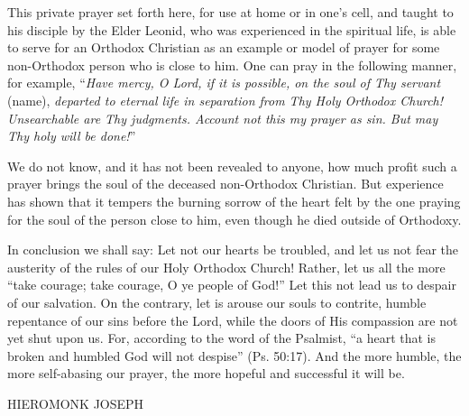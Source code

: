 This private prayer set forth here, for use at home or in one's cell, and taught to his disciple by the Elder Leonid, who was experienced in the spiritual life, is able to serve for an Orthodox Christian as an example or model of prayer for some non-Orthodox person who is close to him. One can pray in the following manner, for example, ``\textit{Have mercy, O Lord, if it is possible, on the soul of Thy servant} (name), \textit{departed to eternal life in separation from Thy Holy Orthodox Church! Unsearchable are Thy judgments. Account not this my prayer as sin. But may Thy holy will be done!}''

We do not know, and it has not been revealed to anyone, how much profit such a prayer brings the soul of the deceased non-Orthodox Christian. But experience has shown that it tempers the burning sorrow of the heart felt by the one praying for the soul of the person close to him, even though he died outside of Orthodoxy.

In conclusion we shall say: Let not our hearts be troubled, and let us not fear the austerity of the rules of our Holy Orthodox Church! Rather, let us all the more ``take courage; take courage, O ye people of God!'' Let this not lead us to despair of our salvation. On the contrary, let is arouse our souls to contrite, humble repentance of our sins before the Lord, while the doors of His compassion are not yet shut upon us. For, according to the word of the Psalmist, ``a heart that is broken and humbled God will not despise'' (Ps. 50:17). And the more humble, the more self-abasing our prayer, the more hopeful and successful it will be.

\hspace*{\fill}HIEROMONK JOSEPH
\bigpicgeometry
\thispagestyle{empty}
\vspace*{\fill}
\newsavebox{\stmary}
\begin{figure}[ht]
  \centering
  \label{saint-mary}
\end{figure}
\vspace*{\fill}\restoregeometry
